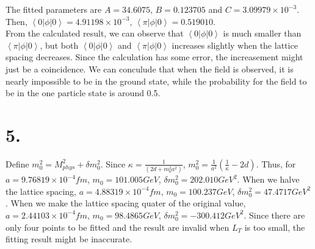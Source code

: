 \documentclass[12pt]{article}
\begin{document}
The fitted parameters are $A = 34.6075$, $B = 0.123705$ and $C = 3.09979\times10^{-3}$. Then, $\left<0|\phi|0\right> = 4.91198\times10^{-3}$, $\left<\pi|\phi|0\right> = 0.519010$. \\
From the calculated result, we can observe that $\left<0|\phi|0\right>$ is much smaller than $\left<\pi|\phi|0\right>$, but both $\left<0|\phi|0\right>$ and $\left<\pi|\phi|0\right>$ increases slightly when the lattice spacing decreases. Since the calculation has some error, the increasement might just be a coincidence. We can conculude that when the field is observed, it is nearly impossible to be in the ground state, while the probability for the field to be in the one particle state is around 0.5. \\

\section*{5.}
Define $m_0^2 = M_{phys}^2 + \delta m_0^2$. Since $\kappa = \frac{1}{(2d+m_0^2a^2)}$, $m_0^2 = \frac{1}{a^2}(\frac{1}{\kappa}-2d)$. Thus, for $a = 9.76819\times 10^{-4} fm$, $m_0 = 101.005GeV$, $\delta m_0^2 = 202.010GeV^2$. When we halve the lattice spacing, $a = 4.88319\times10^{-4} fm$, $m_0 = 100.237GeV$, $\delta m_0^2 = 47.4717GeV^2$. When we make the lattice spacing quater of the original value, $a = 2.44103\times10^{-4} fm$, $m_0 = 98.4865GeV$, $\delta m_0^2 = -300.412GeV^2$. Since there are only four points to be fitted and the result are invalid when $L_T$ is too small, the fitting result might be inaccurate. \\
\end{document}
